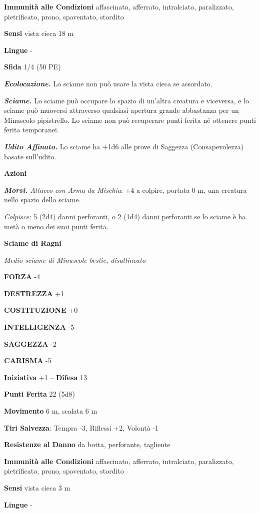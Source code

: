 \begin{multicols}{2}
\textbf{Immunità alle Condizioni} affascinato, afferrato, intralciato, paralizzato, pietrificato, prono, spaventato, stordito

\textbf{Sensi} vista cieca 18 m

\textbf{Lingue} -

\textbf{Sfida} 1/4 (50 PE)

\emph{\textbf{Ecolocazione.}} Lo sciame non può usare la vista cieca se assordato.

\emph{\textbf{Sciame.}} Lo sciame può occupare lo spazio di un'altra creatura e viceversa, e lo sciame può muoversi attraverso qualsiasi apertura grande abbastanza per un Minuscolo pipistrello. Lo sciame non può recuperare punti ferita né ottenere punti ferita temporanei.

\emph{\textbf{Udito Affinato.}} Lo sciame ha +1d6 alle prove di Saggezza (Consapevolezza) basate sull'udito.

\textbf{Azioni}

\emph{\textbf{Morsi.} Attacco con Arma da Mischia}: +4 a colpire, portata 0 m, una creatura nello spazio dello sciame.

\emph{Colpisce:} 5 (2d4) danni perforanti, o 2 (1d4) danni perforanti se lo sciame è ha metà o meno dei suoi punti ferita.

\medskip\textbf{Sciame di Ragni}

\emph{Medio sciame di Minuscole bestie, disallineato}

\textbf{FORZA} -4

\textbf{DESTREZZA} +1

\textbf{COSTITUZIONE} +0

\textbf{INTELLIGENZA} -5

\textbf{SAGGEZZA} -2

\textbf{CARISMA} -5

\textbf{Iniziativa} +1 -- \textbf{Difesa} 13

\textbf{Punti Ferita} 22 (5d8)

\textbf{Movimento} 6 m, scalata 6 m

\textbf{Tiri Salvezza}: Tempra -3, Riflessi +2, Volontà -1

\textbf{Resistenze al Danno} da botta, perforante, tagliente

\textbf{Immunità alle Condizioni} affascinato, afferrato, intralciato, paralizzato, pietrificato, prono, spaventato, stordito

\textbf{Sensi} vista cieca 3 m

\textbf{Lingue} -


\end{multicols}
